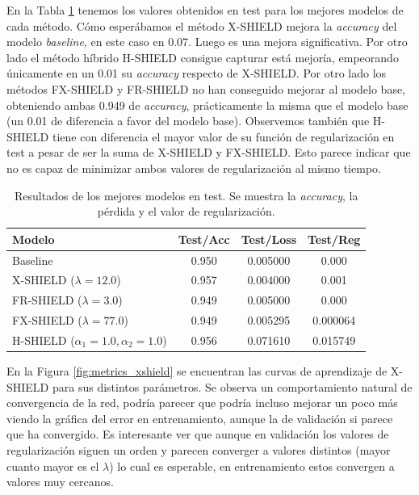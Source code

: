 \newpage
En la Tabla \ref{tab:resultadosMejoresTest} tenemos los valores obtenidos en test para los mejores modelos de cada método. Cómo esperábamos el método X-SHIELD mejora la \textit{accuracy} del modelo \textit{baseline}, en este caso en 0.07. Luego es una mejora significativa. Por otro lado el método híbrido H-SHIELD consigue capturar está mejoría, empeorando únicamente en un 0.01 su \textit{accuracy} respecto de X-SHIELD. Por otro lado los métodos FX-SHIELD y FR-SHIELD no han conseguido mejorar al modelo base, obteniendo ambas 0.949 de \textit{accuracy}, prácticamente la misma que el modelo base (un 0.01 de diferencia a favor del modelo base). Observemos también que H-SHIELD tiene con diferencia el mayor valor de su función de regularización en test a pesar de ser la suma de X-SHIELD y FX-SHIELD. Esto parece indicar que no es capaz de minimizar ambos valores de regularización al mismo tiempo.

\begin{table}[htbp]
\centering
{} %
\setlength{\arrayrulewidth}{0.8pt} %
\begin{tabular}{|l|ccc|}
\hline
\rowcolor{gray!50} Modelo & Test/Acc & Test/Loss & Test/Reg \\
\hline
Baseline & 0.950 & 0.005000 & 0.000 \\
X-SHIELD ($\lambda = 12.0$) & 0.957 & 0.004000 & 0.001 \\
FR-SHIELD ($\lambda = 3.0$) & 0.949 & 0.005000 & 0.000 \\
FX-SHIELD ($\lambda = 77.0$) & 0.949 & 0.005295 & 0.000064 \\
H-SHIELD ($\alpha_1=1.0, \alpha_2=1.0$) & 0.956 & 0.071610 & 0.015749 \\
\hline
\end{tabular}
\caption{Resultados de los mejores modelos en test. Se muestra la \textit{accuracy}, la pérdida y el valor de regularización.}
\label{tab:resultadosMejoresTest}
\end{table}


En la Figura \ref{fig:metrics_xshield} se encuentran las curvas de aprendizaje de X-SHIELD para sus distintos parámetros. Se observa un comportamiento natural de convergencia de la red, podría parecer que podría incluso mejorar un poco más viendo la gráfica del error en entrenamiento, aunque la de validación si parece que ha convergido. Es interesante ver que aunque en validación los valores de regularización siguen un orden y parecen converger a valores distintos (mayor cuanto mayor es el $\lambda$) lo cual es esperable, en entrenamiento estos convergen a valores muy cercanos.


